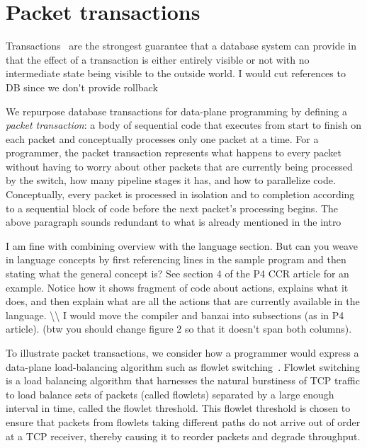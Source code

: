 \section{Packet transactions}
\label{s:transactions}
Transactions~\cite{db_trans} are the strongest guarantee that a database system
can provide in that the effect of a transaction is either entirely visible or
not with no intermediate state being visible to the outside world.
\ac{I would cut references to DB since we don't provide rollback}

We repurpose database transactions for data-plane programming by defining a
\textit{packet transaction}: a body of sequential code that executes from start
to finish on each packet and conceptually processes only one packet at a time.
For a programmer, the packet transaction represents what happens to every
packet without having to worry about other packets that are currently being
processed by the switch, how many pipeline stages it has, and how to
parallelize code. Conceptually, every packet is processed in isolation and to
completion according to a sequential block of code before the next packet's
processing begins.
\ac{The above paragraph sounds redundant to what is already mentioned in 
the intro}

\ac{I am fine with combining overview with the language section.
But can you weave in language concepts by first referencing lines in the sample
program and then stating what the general concept is? See section 4 of the
P4 CCR article for an example. Notice how it shows fragment of code about
actions, explains what it does, and then explain what are all the actions
that are currently available in the language. \\
I would move the compiler and banzai into subsections (as in P4 article).
(btw you should
change figure 2 so that it doesn't span both columns).
}


To illustrate packet transactions, we consider how a programmer would express a
data-plane load-balancing algorithm such as flowlet switching~\cite{flowlet}.
Flowlet switching is a load balancing algorithm that harnesses the natural
burstiness of TCP traffic to load balance sets of packets (called flowlets)
separated by a large enough interval in time, called the flowlet threshold.
This flowlet threshold is chosen to ensure that packets from flowlets taking
different paths do not arrive out of order at a TCP receiver, thereby causing
it to reorder packets and degrade throughput.

